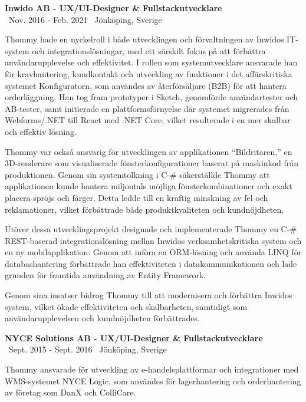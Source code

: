 \documentclass[a4paper,10pt]{article}
\begin{document}
\vspace{0.5cm}
\textbf{Inwido AB - UX/UI-Designer \& Fullstackutvecklare}\\
\normalsize \faCalendar \ Nov. 2016 - Feb. 2021 \quad \faMapMarker \ Jönköping, Sverige

Thommy hade en nyckelroll i både utvecklingen och förvaltningen av Inwidos IT-system och integrationslösningar, med ett särskilt fokus på att förbättra användarupplevelse och effektivitet. I rollen som systemutvecklare ansvarade han för kravhantering, kundkontakt och utveckling av funktioner i det affärskritiska systemet Konfiguratorn, som användes av återförsäljare (B2B) för att hantera orderläggning. Han tog fram prototyper i Sketch, genomförde användartester och AB-tester, samt initierade en plattformsförnyelse där systemet migrerades från Webforms/.NET till React med .NET Core, vilket resulterade i en mer skalbar och effektiv lösning.

Thommy var också ansvarig för utvecklingen av applikationen “Bildritaren,” en 3D-renderare som visualiserade fönsterkonfigurationer baserat på maskinkod från produktionen. Genom sin systemtolkning i C-\# säkerställde Thommy att applikationen kunde hantera miljontals möjliga fönsterkombinationer och exakt placera spröjs och färger. Detta ledde till en kraftig minskning av fel och reklamationer, vilket förbättrade både produktkvaliteten och kundnöjdheten.

Utöver dessa utvecklingsprojekt designade och implementerade Thommy en C-\# REST-baserad integrationslösning mellan Inwidos verksamhetskritiska system och en ny mobilapplikation. Genom att införa en ORM-lösning och använda LINQ för databashantering förbättrade han effektiviteten i datakommunikationen och lade grunden för framtida användning av Entity Framework.

Genom sina insatser bidrog Thommy till att modernisera och förbättra Inwidos system, vilket ökade effektiviteten och skalbarheten, samtidigt som användarupplevelsen och kundnöjdheten förbättrades.

\vspace{0.5cm}
\textbf{NYCE Solutions AB - UX/UI-Designer \& Fullstackutvecklare}\\
\normalsize \faCalendar \ Sept. 2015 - Sept. 2016 \quad \faMapMarker \ Jönköping, Sverige

Thommy ansvarade för utveckling av e-handelsplattformar och integrationer med WMS-systemet NYCE Logic, som användes för lagerhantering och orderhantering av företag som DanX och ColliCare.
\end{document}
